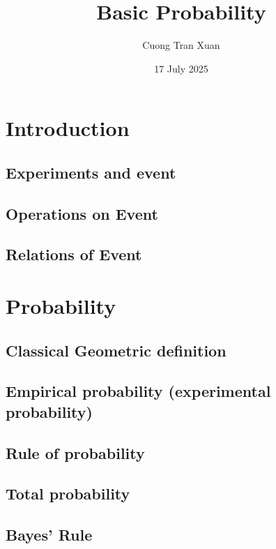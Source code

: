 \documentclass{article}
\title{Basic Probability}
\author{ Cuong Tran Xuan }
\date{ 17 July 2025}
\begin{document}
\maketitle

\section{Introduction}

\subsection{Experiments and event}



\subsection{Operations on Event}

\subsection{Relations of Event}

\section{Probability}

\subsection{Classical Geometric definition}

\subsection{Empirical probability (experimental probability)}

\subsection{Rule of probability}

\subsection{Total probability}

\subsection{Bayes' Rule}
\end{document}
